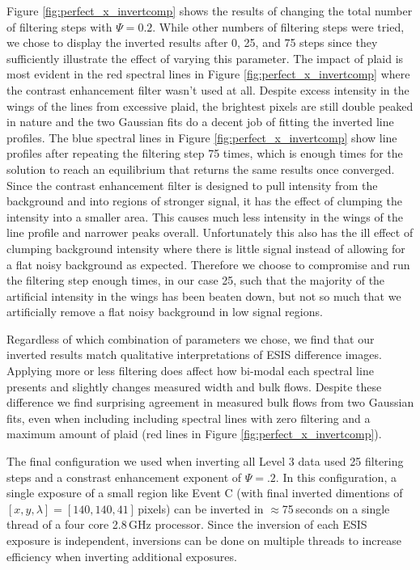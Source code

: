     Figure \ref{fig:perfect_x_invertcomp} shows the results of changing the total number of filtering steps with $\Psi=0.2$.
    While other numbers of filtering steps were tried, we chose to display the inverted results after 0, 25, and 75 steps since they sufficiently illustrate the effect of varying this parameter. 
	The impact of plaid is most evident in the red spectral lines in Figure \ref{fig:perfect_x_invertcomp} where the contrast enhancement filter wasn't used at all.
	Despite excess intensity in the wings of the lines from excessive plaid, the brightest pixels are still double peaked in nature and the two Gaussian fits do a decent job of fitting the inverted line profiles.
	The blue spectral lines in Figure \ref{fig:perfect_x_invertcomp} show line profiles after repeating the filtering step 75 times, which is enough times for the solution to reach an equilibrium that returns the same results once converged.
	Since the contrast enhancement filter is designed to pull intensity from the background and into regions of stronger signal, it has the effect of clumping the intensity into a smaller area.
	This causes much less intensity in the wings of the line profile and narrower peaks overall.  
	Unfortunately this also has the ill effect of clumping background intensity where there is little signal instead of allowing for a flat noisy background as expected.  
	Therefore we choose to compromise and run the filtering step enough times, in our case 25, such that the majority of the artificial intensity in the wings has been beaten down, but not so much that we artificially remove a flat noisy background in low signal regions.
	
	Regardless of which combination of parameters we chose, we find that our inverted results match qualitative interpretations of ESIS difference images.
	Applying more or less filtering does affect how bi-modal each spectral line presents and slightly changes measured width and bulk flows.
	Despite these difference we find surprising agreement in measured bulk flows from two Gaussian fits, even when including including spectral lines with zero filtering and a maximum amount of plaid (red lines in Figure \ref{fig:perfect_x_invertcomp}).
	
	The final configuration we used when inverting all Level 3 data used 25 filtering steps and a constrast enhancement exponent of $\Psi=.2$.
	In this configuration, a single exposure of a small region like Event C (with final inverted dimentions of $[x,y,\lambda] = [140,140,41]$\,pixels) can be inverted in $\approx$75\,seconds on a single thread of a four core 2.8\,GHz processor.
	Since the inversion of each ESIS exposure is independent, inversions can be done on multiple threads to increase efficiency when inverting additional exposures.
	
